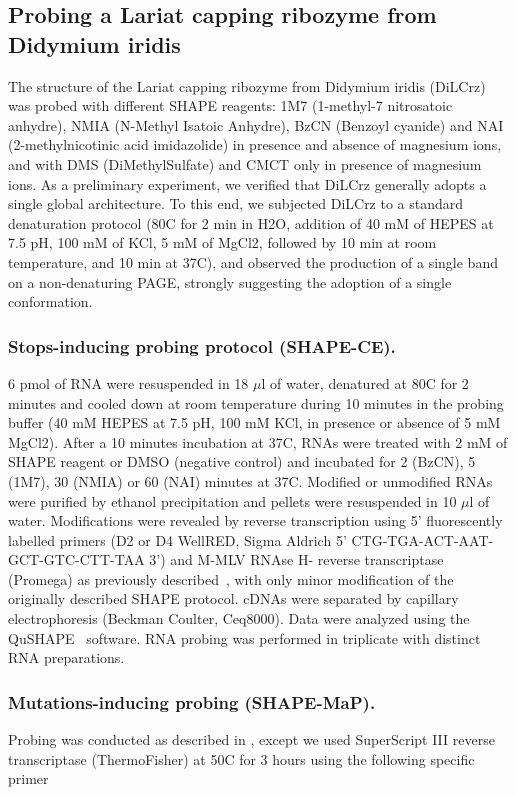 \documentclass[a4,center,fleqn]{NAR}
\begin{document}
\subsection{Probing a Lariat capping ribozyme from Didymium iridis}
The structure of the Lariat capping ribozyme from Didymium iridis (DiLCrz) was probed with different SHAPE reagents: 1M7 (1-methyl-7 nitrosatoic anhydre), NMIA (N-Methyl Isatoic Anhydre), BzCN (Benzoyl cyanide) and NAI (2-methylnicotinic acid imidazolide) in presence and absence of magnesium ions, and with DMS (DiMethylSulfate) and CMCT only in presence of magnesium ions.
As a preliminary experiment, we verified that DiLCrz generally adopts a single global architecture. To this end, we subjected DiLCrz to a standard denaturation protocol (80\degree{}C for 2 min in H2O, addition of 40 mM of HEPES at 7.5 pH, 100 mM of KCl, 5 mM of MgCl2, followed by 10 min at room temperature, and 10 min at 37\degree{}C), and observed the production of a single band on a non-denaturing PAGE, strongly suggesting the adoption of a single conformation.

\subsubsection{Stops-inducing probing protocol (SHAPE-CE).} 
6 pmol of RNA were resuspended in 18 $\mu$l of water, denatured at 80\degree{}C for 2 minutes and cooled down at room temperature during 10 minutes in the probing buffer (40 mM HEPES at 7.5 pH, 100 mM KCl, in presence or absence of 5 mM MgCl2). After a 10 minutes incubation at 37\degree{}C, RNAs were treated with 2 mM of SHAPE reagent or DMSO (negative control) and incubated for 2 (BzCN), 5 (1M7), 30 (NMIA) or 60 (NAI) minutes at 37\degree{}C. Modified or unmodified RNAs were purified by ethanol precipitation and pellets were resuspended in 10 $\mu$l of water.
Modifications were revealed by reverse transcription using 5’ fluorescently labelled primers (D2 or D4 WellRED, Sigma Aldrich 5’ CTG-TGA-ACT-AAT-GCT-GTC-CTT-TAA 3’) and M-MLV RNAse H- reverse transcriptase (Promega) as previously described~\cite{Deforges2017}, with only minor modification of the originally described SHAPE protocol\cite{Wilkinson2006}. cDNAs were separated by capillary electrophoresis (Beckman Coulter, Ceq8000). Data were analyzed using the  QuSHAPE~\cite{Karabiber2013} software. RNA probing was performed in triplicate with distinct RNA preparations.

\subsubsection{Mutations-inducing probing (SHAPE-MaP).}
Probing was conducted as described in \citet{Smola2015}, except we used SuperScript III reverse transcriptase (ThermoFisher) at 50\degree{}C for 3 hours using the following specific primer 
\end{document}
